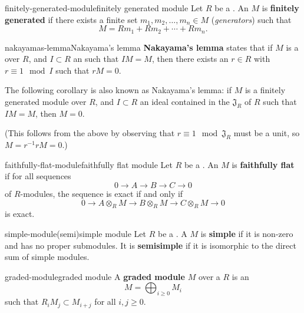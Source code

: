 \begin{topic}{finitely-generated-module}{finitely generated module}
    Let $R$ be a . An  $M$ is \textbf{finitely generated} if there exists a finite set $m_1, m_2, \ldots, m_n \in M$ (\textit{generators}) such that
    \[ M = R m_1 + R m_2 + \cdots + R m_n . \]
\end{topic}

\begin{topic}{nakayamas-lemma}{Nakayama's lemma}
    \textbf{Nakayama's lemma} states that if $M$ is a  over $R$, and $I \subset R$ an  such that $IM = M$, then there exists an $r \in R$ with $r \equiv 1 \mod I$ such that $rM = 0$.
    
    The following corollary is also known as Nakayama's lemma: if $M$ is a finitely generated module over $R$, and $I \subset R$ an ideal contained in the  $\mathfrak{J}_R$ of $R$ such that $IM = M$, then $M = 0$.
    
    (This follows from the above by observing that $r \equiv 1 \mod \mathfrak{J}_R$ must be a unit, so $M = r^{-1} r M = 0$.)
\end{topic}

\begin{topic}{faithfully-flat-module}{faithfully flat module}
    Let $R$ be a . An  $M$ is \textbf{faithfully flat} if for all sequences
    \[ 0 \to A \to B \to C \to 0 \]
    of $R$-modules, the sequence is exact if and only if
    \[ 0 \to A \otimes_R M \to B \otimes_R M \to C \otimes_R M \to 0 \]
    is exact.
\end{topic}

\begin{topic}{simple-module}{(semi)simple module}
    Let $R$ be a . A  $M$ is \textbf{simple} if it is non-zero and has no proper submodules. It is \textbf{semisimple} if it is isomorphic to the direct sum of simple modules.
\end{topic}

\begin{topic}{graded-module}{graded module}
    A \textbf{graded module} $M$ over a  $R$ is an 
    \[ M = \bigoplus_{i \ge 0} M_i \]
    such that $R_i M_j \subset M_{i + j}$ for all $i, j \ge 0$.
\end{topic}

